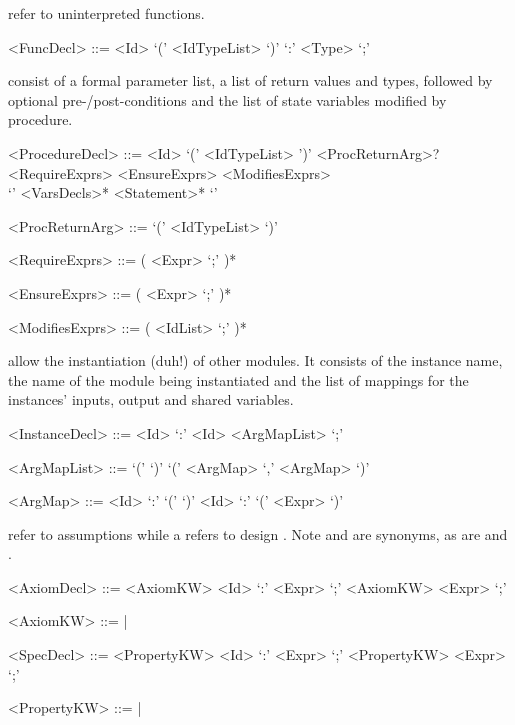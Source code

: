  refer to uninterpreted functions. 
\begin{grammar}
     <FuncDecl> ::= 
        <Id> `(' <IdTypeList> `)' `:' <Type> `;'

\end{grammar}

 consist of a formal parameter list, a list of return values and types, 
followed by optional pre-/post-conditions and the list of state variables modified by procedure.
\begin{grammar}
     <ProcedureDecl> ::=
        <Id> `(' <IdTypeList> ')' <ProcReturnArg>? \\
       <RequireExprs> <EnsureExprs> <ModifiesExprs> \\
       `{' <VarsDecls>* <Statement>* `}'

     <ProcReturnArg> ::=  `(' <IdTypeList> `)'

     <RequireExprs> ::= (  <Expr> `;' )*

     <EnsureExprs> ::= (  <Expr> `;' )*

     <ModifiesExprs> ::= (  <IdList> `;' )*

\end{grammar}

 allow the instantiation (duh!) of other modules. It consists of the instance name, the name of the module being instantiated and the list of mappings for the instances' inputs, output and shared variables. 
\begin{grammar}
     <InstanceDecl> ::=  <Id> `:' <Id> <ArgMapList> `;'

     <ArgMapList>   ::= `(' `)' 
                    \alt `(' <ArgMap> `,' <ArgMap> `)'

     <ArgMap> ::= <Id> `:' `(' `)' 
              \alt <Id> `:' `(' <Expr> `)'
             
\end{grammar}

 refer to assumptions while a  refers to design . Note  and  are synonyms, as are  and .

\begin{grammar}
     <AxiomDecl> ::= <AxiomKW> <Id> `:' <Expr> `;'
                 \alt <AxiomKW> <Expr> `;'

     <AxiomKW> ::=  | 

     <SpecDecl> ::= <PropertyKW> <Id> `:' <Expr> `;'
                 \alt <PropertyKW> <Expr> `;'

     <PropertyKW> ::=  | 
\end{grammar}

